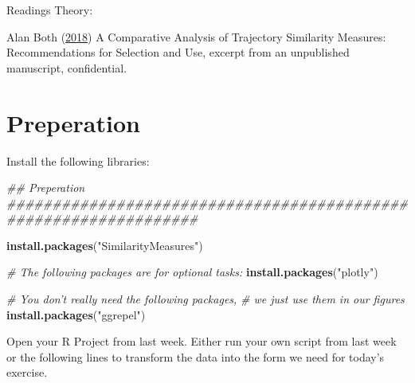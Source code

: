 \documentclass[]{book}
\newenvironment{Shaded}{\begin{snugshade}}{\end{snugshade}}
\newcommand{\CommentTok}[1]{\textcolor[rgb]{0.56,0.35,0.01}{\textit{#1}}}
\newcommand{\KeywordTok}[1]{\textcolor[rgb]{0.13,0.29,0.53}{\textbf{#1}}}
\newcommand{\NormalTok}[1]{#1}
\newcommand{\StringTok}[1]{\textcolor[rgb]{0.31,0.60,0.02}{#1}}
\begin{document}
Readings Theory:

Alan Both (\protect\hyperlink{ref-both2018}{2018}) A Comparative Analysis of Trajectory Similarity Measures: Recommendations for Selection and Use, excerpt from an unpublished manuscript, confidential.

\hypertarget{preperation-2}{%
\section{Preperation}\label{preperation-2}}

Install the following libraries:

\begin{Shaded}
\begin{Highlighting}[]

\CommentTok{## Preperation #################################################################}

\KeywordTok{install.packages}\NormalTok{(}\StringTok{"SimilarityMeasures"}\NormalTok{)}

\CommentTok{# The following packages are for optional tasks:}
\KeywordTok{install.packages}\NormalTok{(}\StringTok{"plotly"}\NormalTok{)}

\CommentTok{# You don't really need the following packages, }
\CommentTok{# we just use them in our figures}
\KeywordTok{install.packages}\NormalTok{(}\StringTok{"ggrepel"}\NormalTok{)}
\end{Highlighting}
\end{Shaded}

Open your R Project from last week. Either run your own script from last week or the following lines to transform the data into the form we need for today's exercise.
\end{document}
